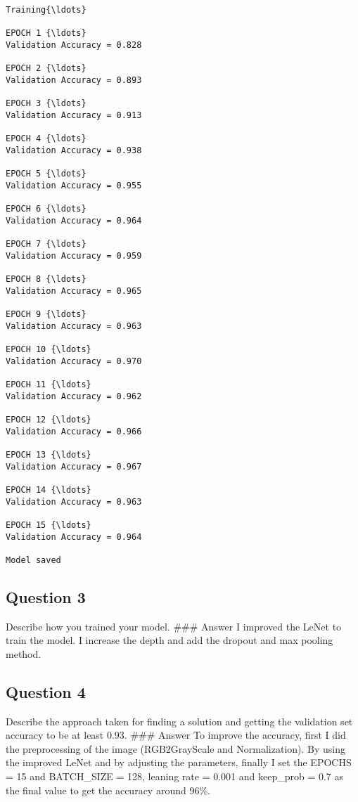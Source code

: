 \documentclass[11pt]{article}
\begin{document}
    \begin{Verbatim}[commandchars=\\\{\}]
Training{\ldots}

EPOCH 1 {\ldots}
Validation Accuracy = 0.828

EPOCH 2 {\ldots}
Validation Accuracy = 0.893

EPOCH 3 {\ldots}
Validation Accuracy = 0.913

EPOCH 4 {\ldots}
Validation Accuracy = 0.938

EPOCH 5 {\ldots}
Validation Accuracy = 0.955

EPOCH 6 {\ldots}
Validation Accuracy = 0.964

EPOCH 7 {\ldots}
Validation Accuracy = 0.959

EPOCH 8 {\ldots}
Validation Accuracy = 0.965

EPOCH 9 {\ldots}
Validation Accuracy = 0.963

EPOCH 10 {\ldots}
Validation Accuracy = 0.970

EPOCH 11 {\ldots}
Validation Accuracy = 0.962

EPOCH 12 {\ldots}
Validation Accuracy = 0.966

EPOCH 13 {\ldots}
Validation Accuracy = 0.967

EPOCH 14 {\ldots}
Validation Accuracy = 0.963

EPOCH 15 {\ldots}
Validation Accuracy = 0.964

Model saved

    \end{Verbatim}

    \hypertarget{question-3}{%
\subsection{Question 3}\label{question-3}}

Describe how you trained your model. \#\#\# Answer I improved the LeNet
to train the model. I increase the depth and add the dropout and max
pooling method.

\hypertarget{question-4}{%
\subsection{Question 4}\label{question-4}}

Describe the approach taken for finding a solution and getting the
validation set accuracy to be at least 0.93. \#\#\# Answer To improve
the accuracy, first I did the preprocessing of the image (RGB2GrayScale
and Normalization). By using the improved LeNet and by adjusting the
parameters, finally I set the EPOCHS = 15 and BATCH\_SIZE = 128, leaning
rate = 0.001 and keep\_prob = 0.7 as the final value to get the accuracy
around 96\%.
\end{document}
